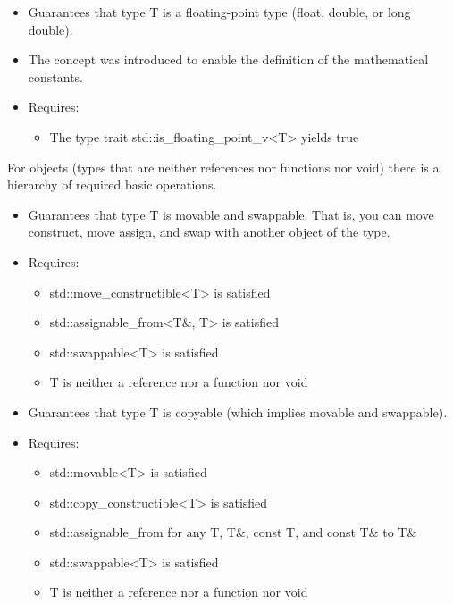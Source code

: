 \begin{itemize}
\item
Guarantees that type T is a floating-point type (float, double, or long double).

\item
The concept was introduced to enable the definition of the mathematical constants.

\item
Requires:
\begin{itemize}
\item
The type trait std::is\_floating\_point\_v<T> yields true
\end{itemize}
\end{itemize}


For objects (types that are neither references nor functions nor void) there is a hierarchy of required basic operations.


\begin{itemize}
\item
Guarantees that type T is movable and swappable. That is, you can move construct, move assign, and swap with another object of the type.

\item
Requires:
\begin{itemize}
\item
std::move\_constructible<T> is satisfied

\item
std::assignable\_from<T\&, T> is satisfied

\item
std::swappable<T> is satisfied

\item
T is neither a reference nor a function nor void
\end{itemize}
\end{itemize}


\begin{itemize}
\item
Guarantees that type T is copyable (which implies movable and swappable).

\item
Requires:
\begin{itemize}
\item
std::movable<T> is satisfied

\item
std::copy\_constructible<T> is satisfied

\item
std::assignable\_from for any T, T\&, const T, and const T\& to T\&

\item
std::swappable<T> is satisfied

\item
T is neither a reference nor a function nor void
\end{itemize}
\end{itemize}

